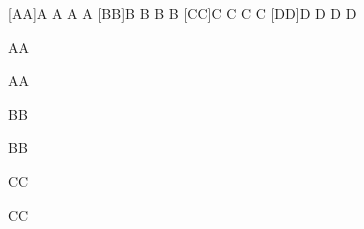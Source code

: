 \documentclass{article}
\begin{document}
\begin{acronym}[TEST]
  [AA]{A A A A}
  [BB]{B B B B}
  [CC]{C C C C}
  [DD]{D D D D}
\end{acronym}

\acs{AA}

\ac{AA}

\acl{BB}

\ac{BB}

\acf{CC}

\ac{CC}
\end{document}
